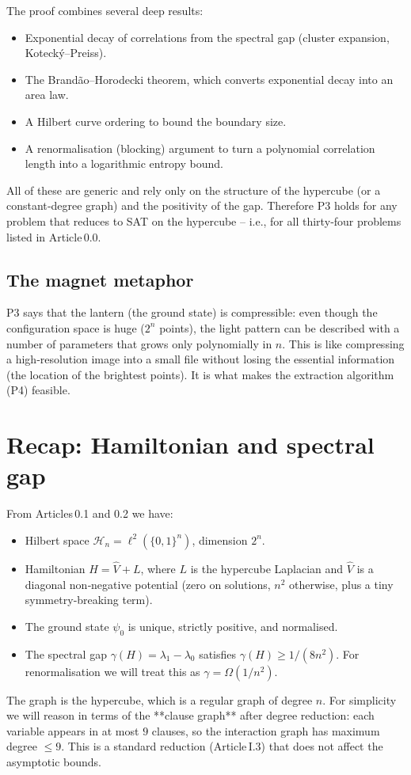 \documentclass[11pt,a4paper]{article}
\begin{document}
The proof combines several deep results:
\begin{itemize}
\item Exponential decay of correlations from the spectral gap (cluster expansion, Kotecký–Preiss).
\item The Brandão–Horodecki theorem, which converts exponential decay into an area law.
\item A Hilbert curve ordering to bound the boundary size.
\item A renormalisation (blocking) argument to turn a polynomial correlation length into a logarithmic entropy bound.
\end{itemize}
All of these are generic and rely only on the structure of the hypercube (or a constant‑degree graph) and the positivity of the gap. Therefore P3 holds for any problem that reduces to SAT on the hypercube – i.e., for all thirty‑four problems listed in Article 0.0.

\subsection*{The magnet metaphor}

P3 says that the lantern (the ground state) is compressible: even though the configuration space is huge (\(2^n\) points), the light pattern can be described with a number of parameters that grows only polynomially in \(n\). This is like compressing a high‑resolution image into a small file without losing the essential information (the location of the brightest points). It is what makes the extraction algorithm (P4) feasible.

\section{Recap: Hamiltonian and spectral gap}

From Articles 0.1 and 0.2 we have:
\begin{itemize}
\item Hilbert space \(\mathcal{H}_n = \ell^2(\{0,1\}^n)\), dimension \(2^n\).
\item Hamiltonian \(H = \hat{V} + L\), where \(L\) is the hypercube Laplacian and \(\hat{V}\) is a diagonal non‑negative potential (zero on solutions, \(n^2\) otherwise, plus a tiny symmetry‑breaking term).
\item The ground state \(\psi_0\) is unique, strictly positive, and normalised.
\item The spectral gap \(\gamma(H) = \lambda_1 - \lambda_0\) satisfies \(\gamma(H) \ge 1/(8n^2)\). For renormalisation we will treat this as \(\gamma = \Omega(1/n^2)\).
\end{itemize}
The graph is the hypercube, which is a regular graph of degree \(n\). For simplicity we will reason in terms of the **clause graph** after degree reduction: each variable appears in at most \(9\) clauses, so the interaction graph has maximum degree \(\le 9\). This is a standard reduction (Article I.3) that does not affect the asymptotic bounds.
\end{document}
